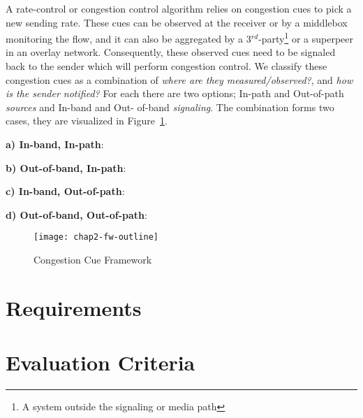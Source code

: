 A rate-control or congestion control algorithm relies on congestion cues to
pick a new sending rate. These cues can be observed at the receiver or by a
middlebox monitoring the flow, and it can also be aggregated by a
3$^{rd}$-party\footnote{A system outside the signaling or media path} or a
superpeer in an overlay network. Consequently, these observed cues need to be
signaled back to the sender which will perform congestion control. We classify
these congestion cues as a combination of \emph{where are they
measured/observed?}, and \emph{how is the sender notified?} For each there
are two options; In-path and Out-of-path \emph{sources} and In-band and Out-
of-band \emph{signaling}. The combination forms two cases, they are visualized
in Figure~\ref{fig:4:fw}.

\textbf{a) In-band, In-path}: 

\textbf{b) Out-of-band, In-path}:

\textbf{c) In-band, Out-of-path}:

\textbf{d) Out-of-band, Out-of-path}:


\begin{figure}[!h]
\texttt{[image: chap2-fw-outline]}
\caption{Congestion Cue Framework}
\label{fig:4:fw}
\end{figure}



\section{Requirements}
\label{fw.cc.req}

\section{Evaluation Criteria}
\label{fw.cc.eval}

